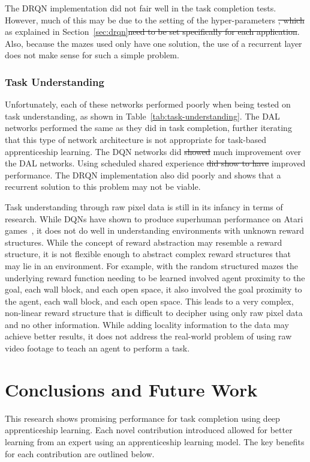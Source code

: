 \documentclass[12pt,american]{report}
\providecommand{\DIFaddtex}[1]{{\protect\color{blue}\uwave{#1}}} %
\providecommand{\DIFdeltex}[1]{{\protect\color{red}\sout{#1}}}                      %
\providecommand{\DIFaddbegin}{} %
\providecommand{\DIFaddend}{} %
\providecommand{\DIFdelbegin}{} %
\providecommand{\DIFdelend}{} %
\providecommand{\DIFadd}[1]{\texorpdfstring{\DIFaddtex{#1}}{#1}} %
\providecommand{\DIFdel}[1]{\texorpdfstring{\DIFdeltex{#1}}{}} %
\newcommand{\DIFscaledelfig}{0.5}
\newlength{\DIFdelgraphicswidth} %
\newlength{\DIFdelgraphicsheight} %
\newcommand{\DIFaddincludegraphics}[2][]{{\color{blue}\fbox{\DIFOincludegraphics[#1]{#2}}}} %
\newcommand{\DIFdelincludegraphics}[2][]{%
\sbox{\DIFdelgraphicsbox}{\DIFOincludegraphics[#1]{#2}}%
\settoboxwidth{\DIFdelgraphicswidth}{\DIFdelgraphicsbox} %
\settoboxtotalheight{\DIFdelgraphicsheight}{\DIFdelgraphicsbox} %
\scalebox{\DIFscaledelfig}{%
\parbox[b]{\DIFdelgraphicswidth}{\usebox{\DIFdelgraphicsbox}\\[-\baselineskip] \rule{\DIFdelgraphicswidth}{0em}}\llap{\resizebox{\DIFdelgraphicswidth}{\DIFdelgraphicsheight}{%
\setlength{\unitlength}{\DIFdelgraphicswidth}%
\begin{picture}(1,1)%
\thicklines\linethickness{2pt} %
{\color[rgb]{1,0,0}\put(0,0){\framebox(1,1){}}}%
{\color[rgb]{1,0,0}\put(0,0){\line( 1,1){1}}}%
{\color[rgb]{1,0,0}\put(0,1){\line(1,-1){1}}}%
\end{picture}%
}\hspace*{3pt}}} %
} %
\DeclareRobustCommand{\DIFaddbegin}{\DIFOaddbegin \let\includegraphics\DIFaddincludegraphics} %
\DeclareRobustCommand{\DIFaddend}{\DIFOaddend \let\includegraphics\DIFOincludegraphics} %
\DeclareRobustCommand{\DIFdelbegin}{\DIFOdelbegin \let\includegraphics\DIFdelincludegraphics} %
\DeclareRobustCommand{\DIFdelend}{\DIFOaddend \let\includegraphics\DIFOincludegraphics} %
\begin{document}
The DRQN implementation did not fair well in the task completion tests. However, much of this may be due to the setting of the hyper-parameters \DIFdelbegin \DIFdel{, which }\DIFdelend \DIFaddbegin \DIFadd{for each application, }\DIFaddend as explained in Section~\ref{sec:drqn}\DIFdelbegin \DIFdel{need to be set specifically for each application}\DIFdelend .  Also, because the mazes used only have one solution, the use of a recurrent layer does not make sense for such a simple problem.

\subsection{Task Understanding}
Unfortunately, each of these networks performed poorly when being tested on task understanding, as shown in Table~\ref{tab:task-understanding}.  The DAL networks performed the same as they did in task completion, further iterating that this type of network architecture is not appropriate for task-based apprenticeship learning. The DQN networks did \DIFdelbegin \DIFdel{showed }\DIFdelend \DIFaddbegin \DIFadd{show }\DIFaddend much improvement over the DAL networks.  Using scheduled shared experience \DIFdelbegin \DIFdel{did show to have }\DIFdelend \DIFaddbegin \DIFadd{resulted in }\DIFaddend improved performance.  The DRQN implementation also did poorly and shows that a recurrent solution to this problem may not be viable. 

Task understanding through raw pixel data is still in its infancy in terms of research.  While DQNs have shown to produce superhuman performance on Atari games~\cite{atari}, it does not do well in understanding environments with unknown reward structures.  While the concept of reward abstraction may resemble a reward structure, it is not flexible enough to abstract complex reward structures that may lie in an environment.  For example, with the random structured mazes the underlying reward function needing to be learned involved agent proximity to the goal, each wall block, and each open space, it also involved the goal proximity to the agent, each wall block, and each open space.  This leads to a very complex, non-linear reward structure that is difficult to decipher using only raw pixel data and no other information.  While adding locality information to the data may achieve better results, it does not address the real-world problem of using raw video footage to teach an agent to perform a task. 


\chapter{Conclusions and Future Work}
\label{sec:conclusions}
This research shows promising performance for task completion using deep apprenticeship learning.  Each novel contribution introduced allowed for better learning from an expert using an apprenticeship learning model.  The key benefits for each contribution are outlined below. 
\end{document}
